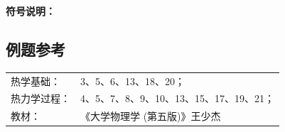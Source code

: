 \textbf{符号说明：}\\

\subsection{例题参考}
\textcolor{mainblue}{%
\begin{tabular}{@{}ll@{}}
热学基础： & 3、5、6、13、18、20； \\
热力学过程： & 4、5、7、8、9、10、13、15、17、19、21； \\
教材： & 《大学物理学 (第五版)》王少杰 \\
\end{tabular}
}
\clearpage